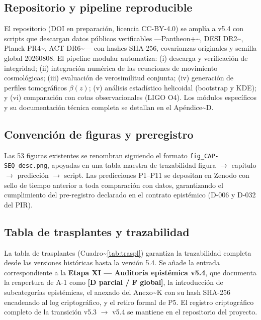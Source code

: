 ﻿\documentclass[11pt,letterpaper]{article}
\begin{document}
\subsection{Repositorio y pipeline reproducible}
El repositorio (DOI en preparación, licencia CC-BY-4.0) se amplía a v5.4 con scripts que descargan datos públicos verificables ---Pantheon+\textasciitilde{}\cite{Brout2022}, DESI DR2\textasciitilde{}\cite{Lodha2025}, Planck PR4\textasciitilde{}\cite{Sullivan2025}, ACT DR6\textasciitilde{}\cite{DiegoPalazuelos2025}--- con hashes SHA-256, covarianzas originales y semilla global 20260808. El pipeline modular automatiza: (i) descarga y verificación de integridad; (ii) integración numérica de las ecuaciones de movimiento cosmológicas; (iii) evaluación de verosimilitud conjunta; (iv) generación de perfiles tomográficos $\beta(z)$; (v) análisis estadístico helicoidal (bootstrap y KDE); y (vi) comparación con cotas observacionales (LIGO O4). Los módulos específicos y su documentación técnica completa se detallan en el Apéndice\textasciitilde{}D.
\subsection{Convención de figuras y preregistro}
Las 53 figuras existentes se renombran siguiendo el formato \texttt{fig\_CAP-SEQ\_desc.png}, apoyadas en una tabla maestra de trazabilidad figura $\to$ capítulo $\to$ predicción $\to$ script. Las predicciones P1--P11 se depositan en Zenodo con sello de tiempo anterior a toda comparación con datos, garantizando el cumplimiento del pre-registro declarado en el contrato epistémico (D-006 y D-032 del PIR).
\subsection{Tabla de trasplantes y trazabilidad}
La tabla de trasplantes (Cuadro\textasciitilde{}\ref{tab:traspl}) garantiza la trazabilidad completa desde las versiones históricas hasta la versión 5.4. Se añade la entrada correspondiente a la \textbf{Etapa XI --- Auditoría epistémica v5.4}, que documenta la reapertura de A-1 como \textbf{[D parcial / F global]}, la introducción de subcategorías epistémicas, el anexado del Anexo\textasciitilde{}K con su hash SHA-256 encadenado al log criptográfico, y el retiro formal de P5. El registro criptográfico completo de la transición v5.3 $\to$ v5.4 se mantiene en el repositorio del proyecto.
\end{document}
